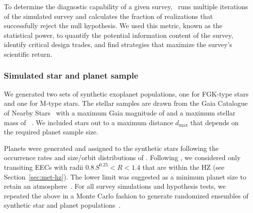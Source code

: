 \documentclass[twocolumn,twocolappendix,linenumbers]{aastex631}
\begin{document}
To determine the diagnostic capability of a given survey, \bioverse\ runs multiple iterations of the simulated survey and calculates the fraction of realizations that successfully reject the null hypothesis.
We used this metric, known as the statistical power, to quantify the potential information content of the survey, identify critical design trades, and find strategies that maximize the survey's scientific return.


\subsubsection{Simulated star and planet sample}
We generated two sets of synthetic exoplanet populations, one for FGK-type stars and one for M-type stars.
The stellar samples are drawn from the Gaia Catalogue of Nearby Stars~\citep{Smart2021} with a maximum Gaia magnitude of  and a maximum stellar mass of ~\SI{}{\Msun}.
We included stars out to a maximum distance $d_{\max}$ that depends on the required planet sample size.

Planets were generated and assigned to the synthetic stars following the occurrence rates and size/orbit distributions of \citet{Bergsten2022}.
Following \citet{Bixel2021}, we considered only transiting \glspl{EEC} with radii $0.8\, S^{0.25} < R < 1.4 $ that are within the \gls{HZ} (see Section~\ref{sec:met-hz}).
The lower limit was suggested as a minimum planet size to retain an atmosphere~\citep{Zahnle2017}.
For all survey simulations and hypothesis tests, we repeated the above in a Monte Carlo fashion to generate randomized ensembles of synthetic star and planet populations~\citep[][]{Bixel2021}.
\end{document}
